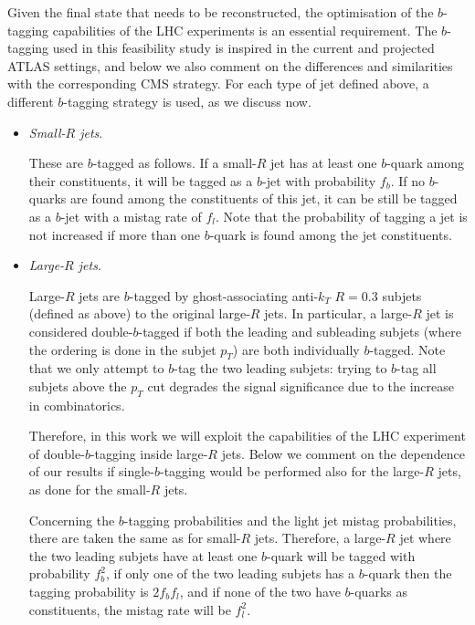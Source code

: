Given the final state that needs to be reconstructed, the
optimisation of the $b$-tagging capabilities of the
LHC experiments is an essential requirement.
%
The $b$-tagging used in this feasibility study is inspired
in the current and projected ATLAS settings, and below
we also comment on the differences and similarities with the
corresponding CMS strategy.
%
For each type of jet defined above, a different
$b$-tagging strategy is used, as we discuss now.

\begin{itemize}

\item {\it Small-$R$ jets}.

  These are $b$-tagged as follows.
  If a small-$R$ jet has at least one $b$-quark among their constituents,
  it will be tagged as a $b$-jet with probability $f_b$.
  If no $b$-quarks are found among the constituents
  of this jet, it can be still be tagged as a $b$-jet with
  a mistag rate of $f_l$.
  Note that the probability of tagging a jet is not increased
  if more than one $b$-quark is found among the jet constituents.

  \item {\it Large-$R$ jets}.

    Large-$R$ jets are $b$-tagged by ghost-associating anti-$k_T$ $R=0.3$
    subjets (defined as above) to the original large-$R$ jets.
    In particular,
    a large-$R$ jet is considered  double-$b$-tagged if both
    the leading and subleading subjets (where the ordering
    is done in the subjet $p_T$) are both individually $b$-tagged.
    Note that we only attempt to $b$-tag the two leading subjets:
    trying to $b$-tag all subjets above the $p_T$ cut degrades
    the signal significance due to the increase in combinatorics.

    Therefore, in this work we will exploit the capabilities of
    the LHC experiment of double-$b$-tagging inside large-$R$ jets.
    Below we comment on the dependence of our results if single-$b$-tagging
    would be performed also for the large-$R$ jets, as done
    for the small-$R$ jets.

    Concerning the $b$-tagging probabilities and the
    light jet mistag probabilities, there are taken
    the same as for small-$R$ jets.
    Therefore, a large-$R$ jet where the two leading
    subjets have at least one $b$-quark will be tagged
    with probability $f_b^2$, if only one of the two leading
    subjets has a $b$-quark then the tagging probability is
    $2f_bf_l$, and if none of the two have $b$-quarks
    as constituents, the mistag rate will be
    $f_l^2$.


\end{itemize}

